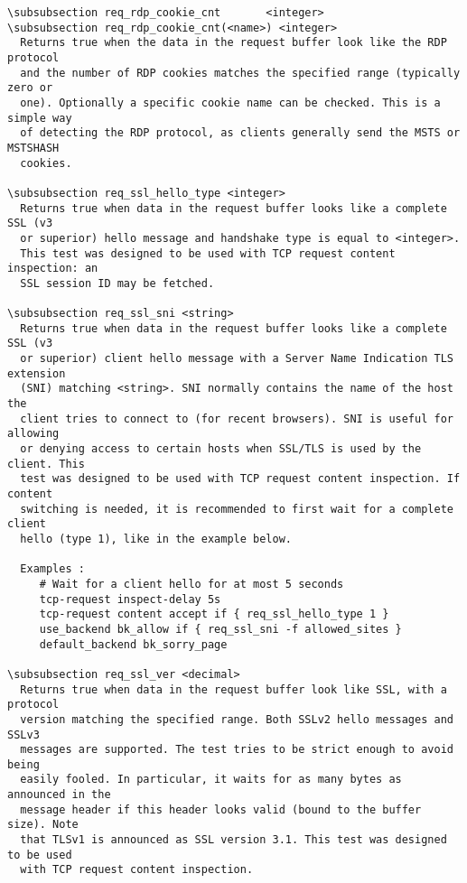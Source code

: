 \begin{verbatim}
\subsubsection req_rdp_cookie_cnt       <integer>
\subsubsection req_rdp_cookie_cnt(<name>) <integer>
  Returns true when the data in the request buffer look like the RDP protocol
  and the number of RDP cookies matches the specified range (typically zero or
  one). Optionally a specific cookie name can be checked. This is a simple way
  of detecting the RDP protocol, as clients generally send the MSTS or MSTSHASH
  cookies.

\subsubsection req_ssl_hello_type <integer>
  Returns true when data in the request buffer looks like a complete SSL (v3
  or superior) hello message and handshake type is equal to <integer>.
  This test was designed to be used with TCP request content inspection: an
  SSL session ID may be fetched.

\subsubsection req_ssl_sni <string>
  Returns true when data in the request buffer looks like a complete SSL (v3
  or superior) client hello message with a Server Name Indication TLS extension
  (SNI) matching <string>. SNI normally contains the name of the host the
  client tries to connect to (for recent browsers). SNI is useful for allowing
  or denying access to certain hosts when SSL/TLS is used by the client. This
  test was designed to be used with TCP request content inspection. If content
  switching is needed, it is recommended to first wait for a complete client
  hello (type 1), like in the example below.

  Examples :
     # Wait for a client hello for at most 5 seconds
     tcp-request inspect-delay 5s
     tcp-request content accept if { req_ssl_hello_type 1 }
     use_backend bk_allow if { req_ssl_sni -f allowed_sites }
     default_backend bk_sorry_page

\subsubsection req_ssl_ver <decimal>
  Returns true when data in the request buffer look like SSL, with a protocol
  version matching the specified range. Both SSLv2 hello messages and SSLv3
  messages are supported. The test tries to be strict enough to avoid being
  easily fooled. In particular, it waits for as many bytes as announced in the
  message header if this header looks valid (bound to the buffer size). Note
  that TLSv1 is announced as SSL version 3.1. This test was designed to be used
  with TCP request content inspection.


\end{verbatim}
